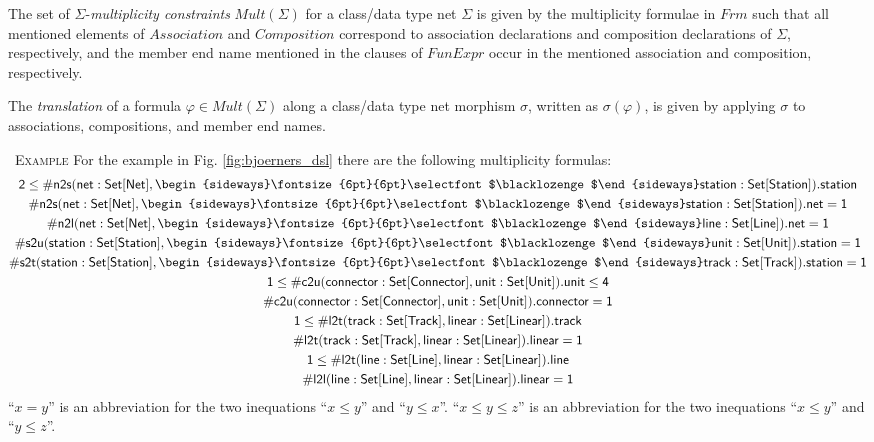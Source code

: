\documentclass[10pt,fleqn,final]{scrreprt}
\newenvironment{definitions}[0]{\medskip }{}
\newenvironment{example}[0]{\ \newline \textsc{Example}\quad }{}
\newcommand{\composition}{\raisebox{0.2pt}{\begin{sideways}\fontsize{6pt}{6pt}\selectfont$\blacklozenge$\end{sideways}}}
\begin{document}
\begin{definitions}
The set of $\Sigma$-\emph{multiplicity constraints}
$\mathit{Mult}(\Sigma)$ for a class/data type net $\Sigma$ is given by the
multiplicity formulae in $\mathit{Frm}$ such that all mentioned elements
of $\mathit{Association}$ and $\mathit{Composition}$ correspond to
association declarations and composition declarations of $\Sigma$,
respectively, and the member end name mentioned in the clauses of
$\mathit{FunExpr}$ occur in the mentioned association and composition,
respectively.

The \emph{translation} of a formula $\varphi \in \mathit{Mult}(\Sigma)$
along a class/data type net morphism $\sigma$, written as $\sigma(\varphi)$,
is given by applying $\sigma$ to associations, compositions, and member end
names.


\begin{example}
 For the example in Fig. \ref{fig:bjoerners_dsl} there are the following multiplicity formulas:
\begin{gather*}
  \mathsf{2 \leq \#n2s(net : Set[Net], \composition station : Set[Station]).station}
\\
  \mathsf{\#n2s(net : Set[Net], \composition station : Set[Station]).net = 1}
\\
  \mathsf{\#n2l(net : Set[Net], \composition line : Set[Line]).net = 1}
\\
  \mathsf{\#s2u(station : Set[Station], \composition unit : Set[Unit]).station = 1}
\\
  \mathsf{\#s2t(station : Set[Station], \composition track : Set[Track]).station = 1}
\\
  \mathsf{1 \leq \#c2u(connector : Set[Connector], unit : Set[Unit]).unit \leq 4}
\\
  \mathsf{\#c2u(connector : Set[Connector], unit : Set[Unit]).connector = 1}
\\
  \mathsf{1 \leq \#l2t(track : Set[Track], linear : Set[Linear]).track}
\\
  \mathsf{\#l2t(track : Set[Track], linear : Set[Linear]).linear = 1}
\\
  \mathsf{1 \leq \#l2t(line : Set[Line], linear : Set[Linear]).line}
\\
  \mathsf{\#l2l(line : Set[Line], linear : Set[Linear]).linear = 1}
\end{gather*}
%
 ``$x = y$'' is an  
abbreviation for the two inequations ``$x\leq y$'' and ``$y\leq x$''.
``$x \leq y \leq z$'' is an abbreviation for the two  inequations 
``$x\leq y$'' and ``$y\leq z$''.

\end{example}



\end{definitions}
\end{document}
